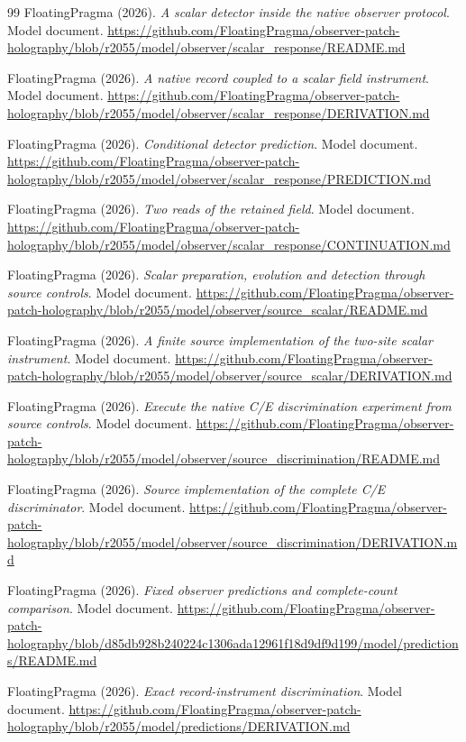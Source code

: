 \documentclass[11pt]{article}
\theoremstyle{definition}
\theoremstyle{remark}
\theoremstyle{plain}
\begin{document}
{\begin{thebibliography}{99}
FloatingPragma (2026). \emph{A scalar detector inside the native observer
protocol}. Model document.
\url{https://github.com/FloatingPragma/observer-patch-holography/blob/r2055/model/observer/scalar_response/README.md}

FloatingPragma (2026). \emph{A native record coupled to a scalar field
instrument}. Model document.
\url{https://github.com/FloatingPragma/observer-patch-holography/blob/r2055/model/observer/scalar_response/DERIVATION.md}

FloatingPragma (2026). \emph{Conditional detector prediction}. Model document.
\url{https://github.com/FloatingPragma/observer-patch-holography/blob/r2055/model/observer/scalar_response/PREDICTION.md}

FloatingPragma (2026). \emph{Two reads of the retained field}. Model document.
\url{https://github.com/FloatingPragma/observer-patch-holography/blob/r2055/model/observer/scalar_response/CONTINUATION.md}

FloatingPragma (2026). \emph{Scalar preparation, evolution and detection through
source controls}. Model document.
\url{https://github.com/FloatingPragma/observer-patch-holography/blob/r2055/model/observer/source_scalar/README.md}

FloatingPragma (2026). \emph{A finite source implementation of the two-site
scalar instrument}. Model document.
\url{https://github.com/FloatingPragma/observer-patch-holography/blob/r2055/model/observer/source_scalar/DERIVATION.md}

FloatingPragma (2026). \emph{Execute the native C/E discrimination experiment
from source controls}. Model document.
\url{https://github.com/FloatingPragma/observer-patch-holography/blob/r2055/model/observer/source_discrimination/README.md}

FloatingPragma (2026). \emph{Source implementation of the complete C/E
discriminator}. Model document.
\url{https://github.com/FloatingPragma/observer-patch-holography/blob/r2055/model/observer/source_discrimination/DERIVATION.md}

FloatingPragma (2026). \emph{Fixed observer predictions and complete-count
comparison}. Model document.
\url{https://github.com/FloatingPragma/observer-patch-holography/blob/d85db928b240224c1306ada12961f18d9df9d199/model/predictions/README.md}

FloatingPragma (2026). \emph{Exact record-instrument discrimination}. Model
document.
\url{https://github.com/FloatingPragma/observer-patch-holography/blob/r2055/model/predictions/DERIVATION.md}


\end{thebibliography}}
\end{document}
